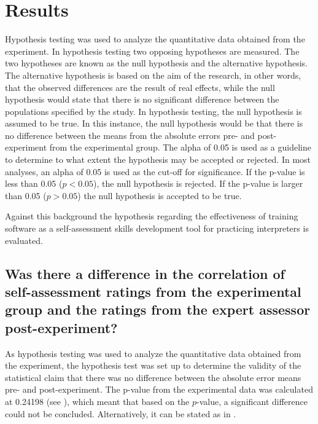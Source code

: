 \documentclass[output=paper]{langsci/langscibook}
\begin{document}
\section{Results}
Hypothesis testing was used to analyze the quantitative data obtained from the experiment. In hypothesis testing two opposing hypotheses are measured. The two hypotheses are known as the null hypothesis and the alternative hypothesis. The alternative hypothesis is based on the aim of the research, in other words, that the observed differences are the result of real effects, while the null hypothesis would state that there is no significant difference between the populations specified by the study. In hypothesis testing, the null hypothesis is assumed to be true. In this instance, the null hypothesis would be that there is no difference between the means from the absolute errors pre- and post-experiment from the experimental group. The alpha of 0.05 is used as a guideline to determine to what extent the hypothesis may be accepted or rejected. In most analyses, an alpha of 0.05 is used as the cut-off for significance. If the p-value is less than 0.05 ($p < 0.05$), the null hypothesis is rejected. If the p-value is larger than 0.05 ($p > 0.05$)
 the null hypothesis is accepted to be true. 

Against this background the hypothesis regarding the effectiveness of training software as a self-assessment skills development tool for practicing interpreters is evaluated.

\subsection{Was there a difference in the correlation of self-assessment ratings from the experimental group and the ratings from the expert assessor post-experiment?}

As hypothesis testing was used to analyze the quantitative data obtained from the experiment, the hypothesis test was set up to determine the validity of the statistical claim that there was no difference between the absolute error means pre- and post-experiment. The p-value from the experimental data was calculated at 0.24198 (see ), which meant that based on the $p$-value, a significant difference could not be concluded. Alternatively, it can be stated as in .
\end{document}
